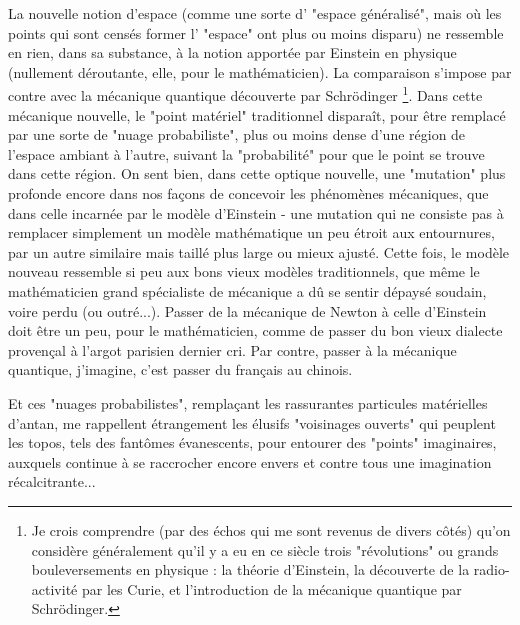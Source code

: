 La nouvelle notion d'espace (comme une sorte d' "espace généralisé", mais où les points qui sont censés former l' "espace" ont plus ou moins disparu) ne ressemble en rien, dans sa substance, à la notion apportée par Einstein en physique (nullement déroutante, elle, pour le mathématicien). La comparaison s'impose par contre avec la mécanique quantique découverte par Schrödinger \footnote{Je crois comprendre (par des échos qui me sont revenus de divers côtés) qu'on considère généralement qu'il y a eu en ce siècle trois "révolutions" ou grands bouleversements en physique : la théorie d'Einstein, la découverte de la radio-activité par les Curie, et l'introduction de la mécanique quantique par Schrödinger.}. Dans cette mécanique nouvelle, le "point matériel" traditionnel disparaît, pour être remplacé par une sorte de "nuage probabiliste", plus ou moins dense d'une région de l'espace ambiant à l'autre, suivant la "probabilité" pour que le point se trouve dans cette région. On sent bien, dans cette optique nouvelle, une "mutation" plus profonde encore dans nos façons de concevoir les phénomènes mécaniques, que dans celle incarnée par le modèle d'Einstein - une mutation qui ne consiste pas à remplacer simplement un modèle mathématique un peu étroit aux entournures, par un autre similaire mais taillé plus large ou mieux ajusté. Cette fois, le modèle nouveau ressemble si peu aux bons vieux modèles traditionnels, que même le mathématicien grand spécialiste de mécanique a dû se sentir dépaysé soudain, voire perdu (ou outré...). Passer de la mécanique de Newton à celle d'Einstein doit être un peu, pour le mathématicien, comme de passer du bon vieux dialecte provençal à l'argot parisien dernier cri. Par contre, passer à la mécanique quantique, j'imagine, c'est passer du français au chinois.

Et ces "nuages probabilistes", remplaçant les rassurantes particules matérielles d'antan, me rappellent étrangement les élusifs "voisinages ouverts" qui peuplent les topos, tels des fantômes évanescents, pour entourer des "points" imaginaires, auxquels continue à se raccrocher encore envers et contre tous une imagination récalcitrante...


